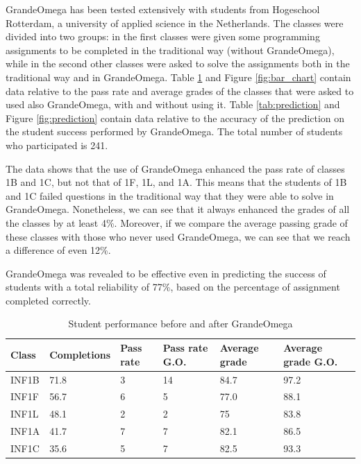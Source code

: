 GrandeOmega has been tested extensively with students from Hogeschool Rotterdam, a university of applied science in the Netherlands. The classes were divided into two groups: in the first classes were given some programming assignments to be completed in the traditional way (without GrandeOmega), while in the second other classes were asked to solve the assignments both in the traditional way and in GrandeOmega. Table \ref{tab:performance_go} and Figure \ref{fig:bar_chart} contain data relative to the pass rate and average grades of the classes that were asked to used also GrandeOmega, with and without using it. Table \ref{tab:prediction} and Figure \ref{fig:prediction} contain data relative to the accuracy of the prediction on the student success performed by GrandeOmega. The total number of students who participated is 241.

The data shows that the use of GrandeOmega enhanced the pass rate of classes 1B and 1C, but not that of 1F, 1L, and 1A. This means that the students of 1B and 1C failed questions in the traditional way that they were able to solve in GrandeOmega. Nonetheless, we can see that it always enhanced the grades of all the classes by at least 4\%. Moreover, if we compare the average passing grade of these classes with those who never used GrandeOmega, we can see that we reach a difference of even 12\%.

GrandeOmega was revealed to be effective even in predicting the success of students with a total reliability of 77\%, based on the percentage of assignment completed correctly.

\begin{table}[!h]
	\begin{tabular}{|p{}|p{}|p{}|p{}|p{}|p{}|}
		\hline
		\textbf{Class} & Completions & Pass rate & Pass rate G.O. & Average grade & Average grade G.O. \\
		\hline
		INF1B & 71.8 & 3 & 14 & 84.7 & 97.2 \\
		\hline
		INF1F & 56.7 & 6 & 5 & 77.0 & 88.1 \\
		\hline
		INF1L & 48.1 & 2 & 2 & 75 & 83.8 \\
		\hline
		INF1A & 41.7 & 7 & 7 & 82.1 & 86.5 \\
		\hline
		INF1C & 35.6 & 5 & 7 & 82.5 & 93.3 \\
		\hline
	\end{tabular}
	\caption{Student performance before and after GrandeOmega}
	\label{tab:performance_go}
\end{table}

